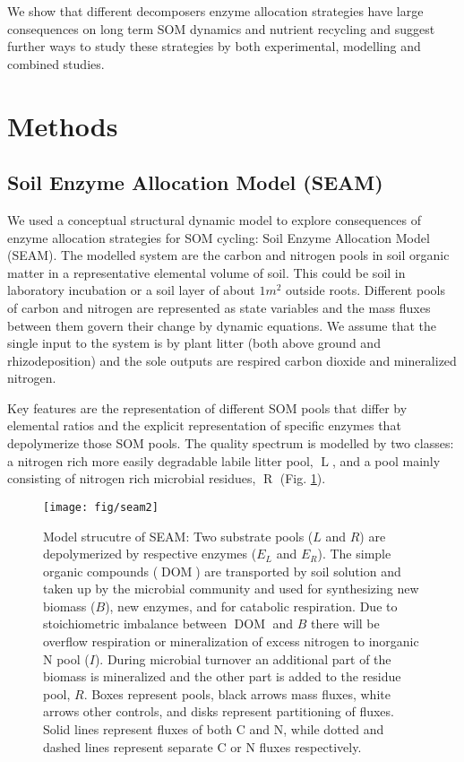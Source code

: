 We show that different decomposers enzyme allocation strategies have large
consequences on long term SOM dynamics and nutrient recycling and suggest
further ways to study these strategies by both experimental, modelling and
combined studies.

\section{Methods}
\subsection{Soil Enzyme Allocation Model (SEAM)}
We used a conceptual structural dynamic model to explore consequences of enzyme
allocation strategies for SOM cycling: Soil Enzyme Allocation Model (SEAM). The
modelled system are the carbon and nitrogen pools in soil organic matter in a
representative elemental volume of soil. This could be soil in laboratory
incubation or a soil layer of about $1 \unit{m}^2$ outside roots. Different
pools of carbon and nitrogen are represented as state variables and the mass
fluxes between them govern their change by dynamic equations. We assume that the
single input to the system is by plant litter (both above ground and
rhizodeposition) and the sole outputs are respired carbon dioxide and
mineralized nitrogen. 

Key features are the representation of different SOM pools that differ by
elemental ratios and the explicit representation of specific enzymes that
depolymerize those SOM pools. The quality spectrum is modelled by two
classes: a nitrogen rich more easily degradable labile litter pool,
$\operatorname{L}$, and a pool mainly consisting of nitrogen rich microbial
residues, $\operatorname{R}$ (Fig. \ref{fig:SEAM}).

\begin{figure}[t] \vspace*{2mm}
\label{fig:SEAM}
\begin{center}
\texttt{[image: fig/seam2]}
\end{center}
\caption{Model strucutre of SEAM: Two substrate pools ($L$ and
$R$) are depolymerized by respective enzymes
($E_L$ and $E_R$). The simple organic
compounds ($\operatorname{DOM}$) are transported by soil solution and taken up
by the microbial community  and used for synthesizing
new biomass (${B}$), new enzymes, and for catabolic respiration. 
Due to stoichiometric imbalance between $\operatorname{DOM}$ and ${B}$
there will be overflow respiration or mineralization of excess nitrogen to
inorganic N pool ($I$).
During microbial turnover an additional part of the biomass is mineralized and the
other part is added to the residue pool, $R$. Boxes represent pools, black
arrows mass fluxes, white arrows other controls, and disks represent
partitioning of fluxes. Solid lines represent fluxes of both C and N, while
dotted and dashed lines represent separate C or N fluxes respectively.}
\end{figure}

